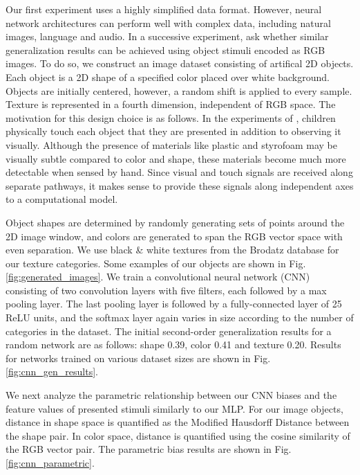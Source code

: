 Our first experiment uses a highly simplified data format. However, neural network
architectures can perform well with complex data, including natural
images, language and audio. In a successive experiment, ask whether similar
generalization results can be achieved using object stimuli encoded as RGB
images. To do so, we construct an image dataset consisting of artifical 2D
objects. Each object is a 2D shape of a specified color placed over white background.
Objects are initially centered, however, a random shift is applied to every sample.
Texture is represented in a fourth dimension, independent of RGB space. The motivation for this design choice
is as follows. In the experiments of \cite{Smith2002}, children physically touch
each object that they are presented in addition to observing it visually. Although the
presence of materials like plastic and styrofoam may be visually subtle compared
to color and shape, these materials become much more detectable when sensed by hand.
Since visual and touch signals are received along separate pathways, it makes
sense to provide these signals along independent axes to a computational model.

Object shapes are determined by randomly generating sets of points around the 2D
image window, and colors are generated to span the RGB vector space with even
separation. We use black \& white textures from the Brodatz database \citep{Brodatz1966}
for our texture categories. Some examples of our objects are shown in Fig.
\ref{fig:generated_images}. We train a convolutional neural network (CNN)
consisting of two convolution layers with five filters, each followed by a max pooling
layer. The last pooling layer is followed by a fully-connected layer of 25 ReLU
units, and the softmax layer again varies in size according to the number of
categories in the dataset. The initial second-order generalization results for a
random network are as follows: shape 0.39, color 0.41 and texture 0.20.
Results for networks trained on various dataset sizes are shown in Fig. \ref{fig:cnn_gen_results}.

We next analyze the parametric relationship between our CNN biases and the feature
values of presented stimuli similarly to our MLP. For our image objects,
distance in shape space is quantified as the Modified Hausdorff Distance
\citep{Dubuisson1994} between the shape pair. In color space, distance is
quantified using the cosine similarity of the RGB vector pair. The parametric
bias results are shown in Fig. \ref{fig:cnn_parametric}.


